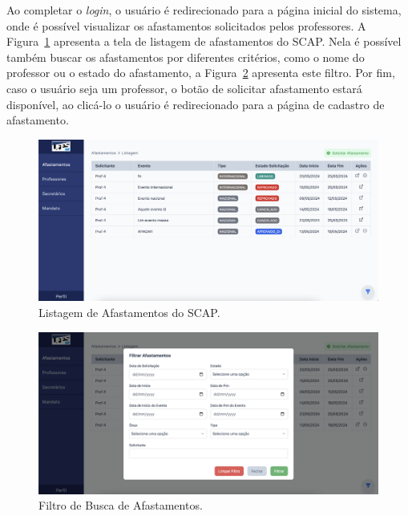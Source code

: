 Ao completar o \textit{login}, o usuário é redirecionado para a página inicial do sistema, onde é possível
visualizar os afastamentos solicitados pelos professores. A Figura~\ref{fig-listagem-afastamentos} apresenta a tela de listagem de afastamentos
do SCAP. Nela é possível também buscar os afastamentos por diferentes critérios, como o nome do professor ou o estado do afastamento,
a Figura~\ref{fig-filtro-afastamentos} apresenta este filtro. Por fim, caso o usuário seja um professor,
o botão de solicitar afastamento estará disponível, ao clicá-lo o usuário é redirecionado para a página de cadastro de afastamento.

\begin{figure}[h!]
    \centering
    \includegraphics[width=\textwidth]{figuras/prints-app/fig-lista-afastamento.png}
    \caption{Listagem de Afastamentos do SCAP.}
    \label{fig-listagem-afastamentos}
\end{figure}

\begin{figure}[h!]
    \centering
    \includegraphics[width=\textwidth]{figuras/prints-app/fig-filtro-afastamento.png}
    \caption{Filtro de Busca de Afastamentos.}
    \label{fig-filtro-afastamentos}
\end{figure}


